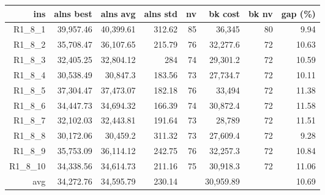   \begin{table}[caption={Kết quả đo với tập HG\_R\_1\_8 800 yêu cầu}, label=exp:HGR18]
    \small
    \centering
    \begin{tabular}{rrrrrrrr}
    \hline
    ins & alns best & alns avg & alns std & nv & bk cost & bk nv & gap (\%) \\ \hline
    R1\_8\_1 & 39,957.46 & 40,399.61 & 312.62 & 85 & 36,345 & 80 & 9.94 \\ \hline
    R1\_8\_2 & 35,708.47 & 36,107.65 & 215.79 & 76 & 32,277.6 & 72 & 10.63 \\ \hline
    R1\_8\_3 & 32,405.25 & 32,804.12 & 284 & 74 & 29,301.2 & 72 & 10.59 \\ \hline
    R1\_8\_4 & 30,538.49 & 30,847.3 & 183.56 & 73 & 27,734.7 & 72 & 10.11 \\ \hline
    R1\_8\_5 & 37,304.47 & 37,473.07 & 182.18 & 76 & 33,494 & 72 & 11.38 \\ \hline
    R1\_8\_6 & 34,447.73 & 34,694.32 & 166.39 & 74 & 30,872.4 & 72 & 11.58 \\ \hline
    R1\_8\_7 & 32,102.03 & 32,443.81 & 191.64 & 73 & 28,789 & 72 & 11.51 \\ \hline
    R1\_8\_8 & 30,172.06 & 30,459.2 & 311.32 & 73 & 27,609.4 & 72 & 9.28 \\ \hline
    R1\_8\_9 & 35,753.09 & 36,114.12 & 242.75 & 76 & 32,257.3 & 72 & 10.84 \\ \hline
    R1\_8\_10 & 34,338.56 & 34,614.73 & 211.16 & 75 & 30,918.3 & 72 & 11.06 \\ \hline
    avg & 34,272.76 & 34,595.79 & 230.14 & & 30,959.89 & & 10.69 \\ \hline
    \end{tabular}
  \end{table}

